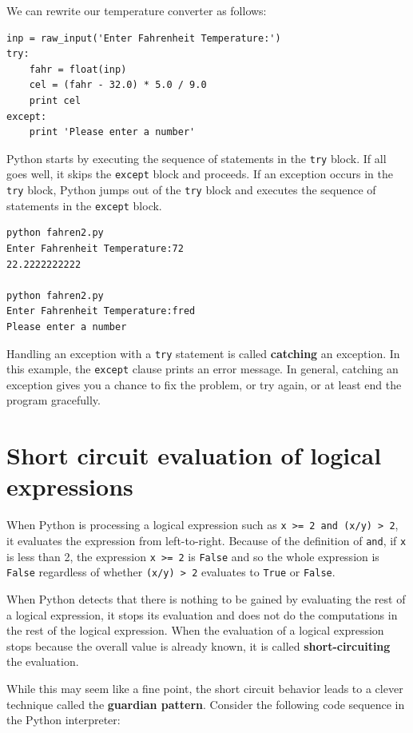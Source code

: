 \documentclass[10pt]{book}
\begin{document}
We can rewrite our temperature converter as follows:

\beforeverb
\begin{verbatim}
inp = raw_input('Enter Fahrenheit Temperature:')
try:
    fahr = float(inp)
    cel = (fahr - 32.0) * 5.0 / 9.0
    print cel
except:
    print 'Please enter a number'
\end{verbatim}
\afterverb
%

Python starts by executing the 
sequence of statements in the 
{\tt try} block.  If all goes
well, it skips the {\tt except} block and proceeds.  If an
exception occurs in the {\tt try} block, 
Python jumps out of the {\tt try} block and
executes the sequence of statements in the {\tt except} block.

\beforeverb
\begin{verbatim}
python fahren2.py 
Enter Fahrenheit Temperature:72
22.2222222222

python fahren2.py 
Enter Fahrenheit Temperature:fred
Please enter a number
\end{verbatim}
\afterverb
%

Handling an exception with a {\tt try} statement is called {\bf
catching} an exception.  In this example, the {\tt except} clause
prints an error message.  In general,
catching an exception gives you a chance to fix the problem, or try
again, or at least end the program gracefully.

\section{Short circuit evaluation of logical expressions}

When Python is processing a logical expression such as 
{\tt x >= 2 and (x/y) > 2}, it evaluates the expression
from left-to-right.  Because of the definition of {\tt and},
if {\tt x} is less than 2, the expression {\tt x >= 2} is 
{\tt False} and so the whole expression is {\tt False} regardless
of whether {\tt (x/y) > 2} evaluates to {\tt True} or {\tt False}.

When Python detects that there is nothing to be gained by evaluating
the rest of a logical expression, it stops its evaluation and does
not do the computations in the rest of the logical expression.  
When the evaluation of a logical expression stops because the overall
value is already known, it is called {\bf short-circuiting} 
the evaluation.

While this may seem like a fine point, the short circuit behavior
leads to a clever technique called the {\bf guardian pattern}.  
Consider the following code sequence in the Python interpreter:
\end{document}
